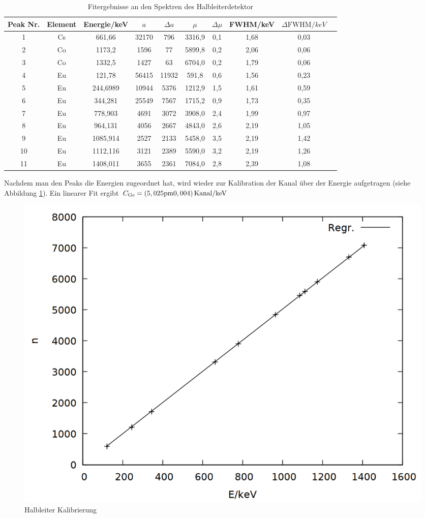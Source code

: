 \newpage

\begin{table}[h]
\caption{Fitergebnisse an den Spektren des Halbleiterdetektor}
\begin{tabular}{cccccccccc}
\toprule
Peak Nr. & Element & Energie/\si{keV}& $a$ & $\Delta a$ & $\mu$ & $\Delta \mu$ & FWHM/\si{keV} & $\Delta \text{FWHM}/\si{keV}$\\
\midrule 
1	&	Cs	&	661,66	&	32170	&	796	&	3316,9	&	0,1	&	1,68	&	0,03\\
2	&	Co	&	1173,2	&	1596	&	77	&	5899,8	&	0,2	&	2,06	&	0,06\\
3	&	Co	&	1332,5	&	1427	&	63	&	6704,0	&	0,2	&	1,79	&	0,06\\
4	&	Eu	&	121,78	&	56415	&	11932	&	591,8	&	0,6	&	1,56	&	0,23\\
5	&	Eu	&	244,6989	&	10944	&	5376	&	1212,9	&	1,5	&	1,61	&	0,59\\
6	&	Eu	&	344,281	&	25549	&	7567	&	1715,2	&	0,9	&	1,73	&	0,35\\
7	&	Eu	&	778,903	&	4691	&	3072	&	3908,0	&	2,4	&	1,99	&	0,97\\
8	&	Eu	&	964,131	&	4056	&	2667	&	4843,0	&	2,6	&	2,19	&	1,05\\
9	&	Eu	&	1085,914	&	2527	&	2133	&	5458,0	&	3,5	&	2,19	&	1,42\\
10	&	Eu	&	1112,116	&	3121	&	2389	&	5590,0	&	3,2	&	2,19	&	1,26\\
11	&	Eu	&	1408,011	&	3655	&	2361	&	7084,0	&	2,8	&	2,39	&	1,08\\
\bottomrule
\end{tabular}
\label{tab:ge}
\end{table}

Nachdem man den Peaks die Energien zugeordnet hat, wird wieder zur Kalibration der Kanal über der Energie aufgetragen (siehe Abbildung \ref{fig:ge_gauge}). Ein linearer Fit ergibt $C\ind{Ge} = \si{(5,025\pm 0,004)\,Kanal/keV}$

\begin{figure}[h]
\centering
\includegraphics[width=0.7\linewidth]{data/ge_gauge.png}
\caption{Halbleiter Kalibrierung}
\label{fig:ge_gauge}
\end{figure}

